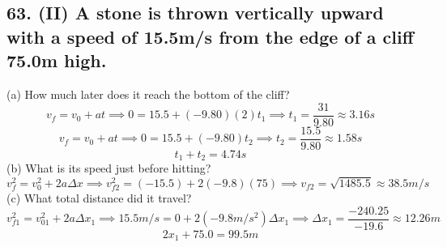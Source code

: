 \documentclass[12pt,a4paper,english]{article}
\begin{document}
\begin{flushleft}
      \subsection{63. (II) A stone is thrown vertically upward with a speed of 15.5m/s from the edge of a cliff 75.0m high.}
      (a) How much later does it reach the bottom of the cliff?
      \[
        v_{f}=v_{0}+at \implies
        0=15.5+(-9.80)(2)t_1 \implies
        t_1=\frac{31}{9.80} \approx 3.16s
      \]
      \[
        v_{f}=v_{0}+at \implies
        0=15.5+(-9.80)t_2 \implies
        t_2=\frac{15.5}{9.80}\approx 1.58s
      \]
      \[
        t_1+t_2=4.74s
      \]
      (b) What is its speed just before hitting?
      \[
        v_{f}^2=v_{0}^2+2a\Delta x \implies
        v_{f2}^2=(-15.5)+2(-9.8)(75) \implies
        v_{f2}=\sqrt{1485.5}\approx 38.5m/s
      \]
      (c) What total distance did it travel?
      \[
        v_{f1}^2=v_{01}^2+2a\Delta x_1\implies 
        15.5m/s=0+2(-9.8m/s^2)\Delta x_1\implies 
        \Delta x_1 = \frac{-240.25}{-19.6} \approx 12.26m
      \]
      \[
        2x_1+75.0=99.5m
      \]
\end{flushleft}
\end{document}
